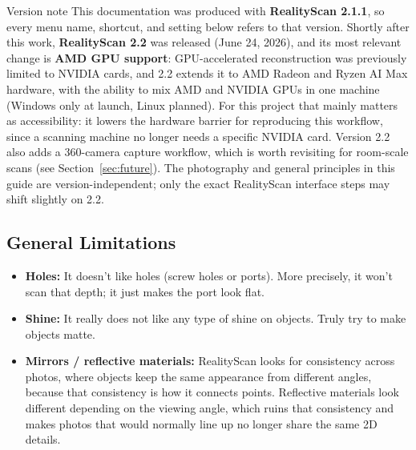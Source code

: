 \documentclass[11pt]{article}
\begin{document}
\begin{notebox}{Version note}
This documentation was produced with \textbf{RealityScan 2.1.1}, so every menu name, shortcut, and setting below refers to that version. Shortly after this work, \textbf{RealityScan 2.2} was released (June 24, 2026), and its most relevant change is \textbf{AMD GPU support}: GPU-accelerated reconstruction was previously limited to NVIDIA cards, and 2.2 extends it to AMD Radeon and Ryzen AI Max hardware, with the ability to mix AMD and NVIDIA GPUs in one machine (Windows only at launch, Linux planned). For this project that mainly matters as accessibility: it lowers the hardware barrier for reproducing this workflow, since a scanning machine no longer needs a specific NVIDIA card. Version 2.2 also adds a 360-camera capture workflow, which is worth revisiting for room-scale scans (see Section~\ref{sec:future}). The photography and general principles in this guide are version-independent; only the exact RealityScan interface steps may shift slightly on 2.2.
\end{notebox}

\subsection{General Limitations}
\begin{itemize}[leftmargin=1.4em]
  \item \textbf{Holes:} It doesn't like holes (screw holes or ports). More precisely, it won't scan that depth; it just makes the port look flat.
  \item \textbf{Shine:} It really does not like any type of shine on objects. Truly try to make objects matte.
  \item \textbf{Mirrors / reflective materials:} RealityScan looks for consistency across photos, where objects keep the same appearance from different angles, because that consistency is how it connects points. Reflective materials look different depending on the viewing angle, which ruins that consistency and makes photos that would normally line up no longer share the same 2D details.
\end{itemize}
\end{document}
